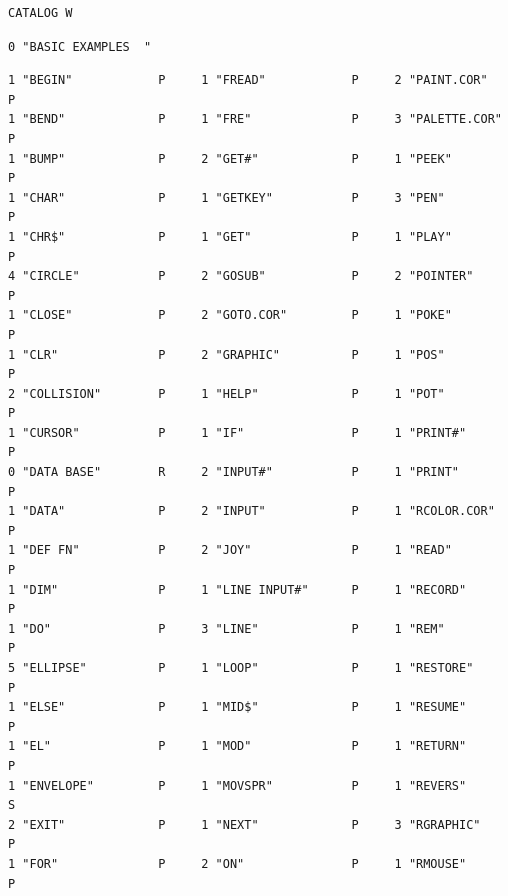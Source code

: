 \begin{description}[leftmargin=2cm,style=nextline]
\begin{tcolorbox}[colback=black,coltext=white]
\verbatimfont{\codefont}
\begin{verbatim}
CATALOG W
\end{verbatim}
\begin{tcolorbox}[colback=white,coltext=black,arc=0mm,boxrule=0mm,
left*=0.5mm,right*=0mm,top=0mm,bottom=0mm,nobeforeafter,left skip=0.5mm,width=28mm,height=3mm,valign=center]
\begin{verbatim}
0 "BASIC EXAMPLES  "
\end{verbatim}
\end{tcolorbox}
\begin{verbatim}
1 "BEGIN"            P     1 "FREAD"            P     2 "PAINT.COR"        P
1 "BEND"             P     1 "FRE"              P     3 "PALETTE.COR"      P
1 "BUMP"             P     2 "GET#"             P     1 "PEEK"             P
1 "CHAR"             P     1 "GETKEY"           P     3 "PEN"              P
1 "CHR$"             P     1 "GET"              P     1 "PLAY"             P
4 "CIRCLE"           P     2 "GOSUB"            P     2 "POINTER"          P
1 "CLOSE"            P     2 "GOTO.COR"         P     1 "POKE"             P
1 "CLR"              P     2 "GRAPHIC"          P     1 "POS"              P
2 "COLLISION"        P     1 "HELP"             P     1 "POT"              P
1 "CURSOR"           P     1 "IF"               P     1 "PRINT#"           P
0 "DATA BASE"        R     2 "INPUT#"           P     1 "PRINT"            P
1 "DATA"             P     2 "INPUT"            P     1 "RCOLOR.COR"       P
1 "DEF FN"           P     2 "JOY"              P     1 "READ"             P
1 "DIM"              P     1 "LINE INPUT#"      P     1 "RECORD"           P
1 "DO"               P     3 "LINE"             P     1 "REM"              P
5 "ELLIPSE"          P     1 "LOOP"             P     1 "RESTORE"          P
1 "ELSE"             P     1 "MID$"             P     1 "RESUME"           P
1 "EL"               P     1 "MOD"              P     1 "RETURN"           P
1 "ENVELOPE"         P     1 "MOVSPR"           P     1 "REVERS"           S
2 "EXIT"             P     1 "NEXT"             P     3 "RGRAPHIC"         P
1 "FOR"              P     2 "ON"               P     1 "RMOUSE"           P
\end{verbatim}
\end{tcolorbox}
\end{description}


